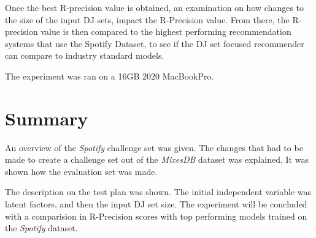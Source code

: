 Once the best R-precision value is obtained, an examination on how changes to the size of the input DJ sets, impact the R-Precision value. From there, the R-precision value is then compared to the highest performing recommendation systems that use the Spotify Dataset, to see if the DJ set focused recommender can compare to industry standard models.

The experiment was ran on a 16GB 2020 MacBookPro.

\section{Summary}
An overview of the \textit{Spotify} challenge set was given. The changes that had to be made to create a challenge set out of the \textit{MixesDB} dataset was explained. It was  shown how the evaluation set was made. 

The description on the test plan was shown. The initial independent variable was latent factors, and then the input DJ set size. The experiment will be concluded with a comparision in R-Precision scores with top performing models trained on the \textit{Spotify} dataset.

